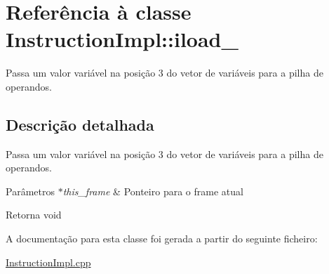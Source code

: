 \hypertarget{class_instruction_impl_1_1iload__3}{}\section{Referência à classe Instruction\+Impl\+:\+:iload\+\_}
\label{class_instruction_impl_1_1iload__3}


Passa um valor variável na posição 3 do vetor de variáveis para a pilha de operandos.  




\subsection{Descrição detalhada}
Passa um valor variável na posição 3 do vetor de variáveis para a pilha de operandos. 


\begin{DoxyParams}{Parâmetros}
{\em $\ast$this\+\_\+frame} & Ponteiro para o frame atual \\
\hline
\end{DoxyParams}
\begin{DoxyReturn}{Retorna}
void 
\end{DoxyReturn}


A documentação para esta classe foi gerada a partir do seguinte ficheiro\+:\begin{DoxyCompactItemize}
\item 
\hyperlink{_instruction_impl_8cpp}{Instruction\+Impl.\+cpp}\end{DoxyCompactItemize}
